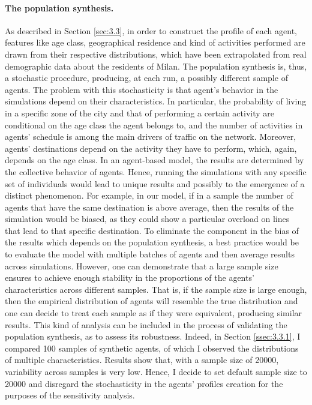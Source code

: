 \paragraph{The population synthesis.} 
As described in Section \ref{sec:3.3}, in order to construct the profile of each agent, features like age class, geographical residence and kind of activities performed are drawn from their respective distributions, which have been extrapolated from real demographic data about the residents of Milan. The population synthesis is, thus, a stochastic procedure, producing, at each run, a possibly different sample of agents. The problem with this stochasticity is that agent's behavior in the simulations depend on their characteristics. In particular, the probability of living in a specific zone of the city and that of performing a certain activity are conditional on the age class the agent belongs to, and the number of activities in agents' schedule is among the main drivers of traffic on the network. Moreover, agents' destinations depend on the activity they have to perform, which, again, depends on the age class. In an agent-based model, the results are determined by the collective behavior of agents. Hence, running the simulations with any specific set of individuals would lead to unique results and possibly to the emergence of a distinct phenomenon. For example, in our model, if in a sample the number of agents that have the same destination is above average, then the results of the simulation would be biased, as they could show a particular overload on lines that lead to that specific destination. To eliminate the component in the bias of the results which depends on the population synthesis, a best practice would be to evaluate the model with multiple batches of agents and then average results across simulations. However, one can demonstrate that a large sample size ensures to achieve enough stability in the proportions of the agents' characteristics across different samples. That is, if the sample size is large enough, then the empirical distribution of agents will resemble the true distribution and one can decide to treat each sample as if they were equivalent, producing similar results. This kind of analysis can be included in the process of validating the population synthesis, as to assess its robustness. Indeed, in Section \ref{ssec:3.3.1}, I compared 100 samples of synthetic agents, of which I observed the distributions of multiple characteristics. Results show that, with a sample size of 20000, variability across samples is very low. Hence, I decide to set default sample size to 20000 and disregard the stochasticity in the agents' profiles creation for the purposes of the sensitivity analysis.

